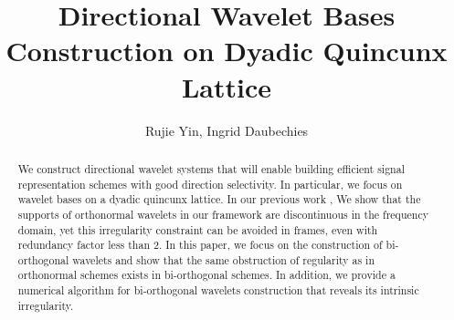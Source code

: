 \documentclass[]{article}
\begin{document}
\newtheorem{lem}{Lemma}
\newtheorem*{mydef}{Definition}
\newtheorem{thm}{Theorem}
\newtheorem{prop}{Proposition}
\newtheorem*{notat}{Notation}

\abovedisplayskip=2pt
\belowdisplayskip=2pt
\abovedisplayshortskip=2pt
\belowdisplayshortskip=2pt


\title{Directional Wavelet Bases Construction on Dyadic Quincunx Lattice}
\author{Rujie Yin, Ingrid Daubechies}
\maketitle

\begin{abstract}
We construct directional wavelet systems that will enable building efficient signal representation schemes with good direction selectivity. In particular, we focus on wavelet bases on a dyadic quincunx lattice.
In our previous work \cite{yin2014orthshear}, We show that the supports of orthonormal wavelets in our framework are discontinuous in the frequency domain, yet this irregularity constraint can be avoided in frames, even with redundancy factor less than 2. In this paper, we focus on the construction of bi-orthogonal wavelets and show that the same obstruction of regularity as in orthonormal schemes exists in bi-orthogonal schemes. In addition, we provide a numerical algorithm for bi-orthogonal wavelets construction that reveals its intrinsic irregularity.
\end{abstract}




%


%


%


%


%

\newpage
\begin{appendices}



%
%
\end{appendices}
\end{document}
